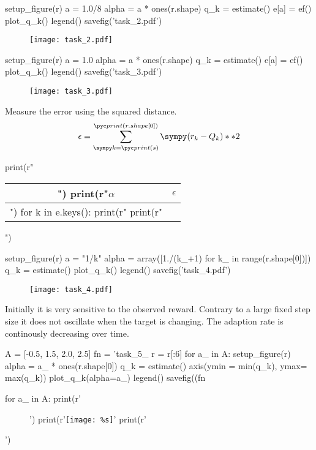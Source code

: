 \begin{pycode}
setup_figure(r)
a = 1.0/8 
alpha = a * ones(r.shape)
q_k = estimate()
e[a] = ef()
plot_q_k()
legend()
savefig('task_2.pdf')

\end{pycode}

\begin{figure}[ht]
\texttt{[image: task\_2.pdf]}
\end{figure}
\begin{pycode}

setup_figure(r)
a = 1.0
alpha = a * ones(r.shape)
q_k = estimate()
e[a] = ef()
plot_q_k()
legend()
savefig('task_3.pdf')

\end{pycode}
\begin{figure}[ht]
\texttt{[image: task\_3.pdf]}
\end{figure}
Measure the error using the squared distance.
$$\epsilon = \sum\limits_{\s{k}=\pp{s}}^{\pp{r.shape[0]}}\s{(r_k - Q_k)**2}$$
\begin{pycode}
print(r"\begin{tabular}{c|c}")
print(r"$\alpha$ & $\epsilon$ \\ \hline")
for k in e.keys():
	print(r"%
print(r"\end{tabular}")
\end{pycode}

\begin{pycode}

setup_figure(r)
a = "1/k"
alpha = array([1./(k_+1) for k_ in range(r.shape[0])])
q_k = estimate()
plot_q_k()
legend()
savefig('task_4.pdf')

\end{pycode}
\begin{figure}[ht]
\texttt{[image: task\_4.pdf]}
\end{figure}
Initially it is very sensitive to the observed reward.
Contrary to a large fixed step size it does not oscillate when the target is changing.
The adaption rate is continously decreasing over time.
\begin{pycode}

A = [-0.5, 1.5, 2.0, 2.5]
fn = 'task_5_%
r = r[:6]
for a_ in A:
	setup_figure(r)
	alpha = a_ * ones(r.shape[0])
	q_k = estimate()
	axis(ymin = min(q_k), ymax= max(q_k))
	plot_q_k(alpha=a_)
	legend()
	savefig((fn %

\end{pycode}

\begin{pycode}

for a_ in A:
	print(r'\begin{figure}[ht]')
	print(r'\texttt{[image: \%s]}' %
	print(r'\end{figure}')

\end{pycode}


